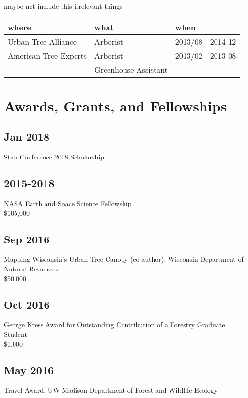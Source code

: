 \documentclass{article}
\begin{document}
maybe not include this irrelevant things

\begin{center}
\begin{tabular}{lll}
where & what & when\\
\hline
Urban Tree Alliance & Arborist & 2013/08 - 2014-12\\
American Tree Experts & Arborist & 2013/02 - 2013-08\\
 & Greenhouse Assistant & \\
\end{tabular}
\end{center}


\section*{Awards, Grants, and Fellowships}
\label{sec:org771333b}
\subsection*{Jan 2018}
\label{sec:orgc70e831}
\href{http://mc-stan.org/events/}{Stan Conference 2018} Scholarship

\subsection*{2015-2018}
\label{sec:org6c73d3d}
NASA Earth and Space Science \href{https://nspires.nasaprs.com/external/viewrepositorydocument/cmdocumentid=459947/solicitationId=\%7BB6CDCEA6-8EDD-A48A-FAF8-E588F66661C3\%7D/viewSolicitationDocument=1/NESSF15\%20selections.pdf}{Fellowship}\\
\$105,000

\subsection*{Sep 2016}
\label{sec:orgbd7e8ea}
Mapping Wisconsin's Urban Tree Canopy (co-author), Wisconsin
Department of Natural Resources\\
\$50,000

\subsection*{Oct 2016}
\label{sec:org23e0891}
\href{https://kb.wisc.edu/russell/page.php?id=65402}{George Kress Award} for Outstanding Contribution of a Forestry Graduate
Student \\
\$1,000

\subsection*{May 2016}
\label{sec:org6f18764}
Travel Award, UW-Madison Department of Forest and Wildlife Ecology\\
\end{document}
